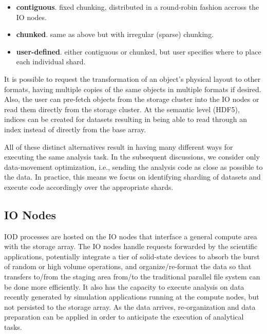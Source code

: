 \documentclass[conference]{IEEEtran}
\begin{document}
\begin{itemize}
\itemsep1pt\parskip0pt
\item
  \textbf{contiguous}. fixed chunking, distributed in a round-robin
  fashion accross the IO nodes.
\item
  \textbf{chunked}. same as above but with irregular (sparse) chunking.
\item
  \textbf{user-defined}. either contiguous or chunked, but user specifies
  where to place each individual shard.
\end{itemize}

It is possible to request the transformation of an object's physical
layout to other formats, having multiple copies of the same objects in
multiple formats if desired. Also, the user can pre-fetch objects from
the storage cluster into the IO nodes or read them directly from the
storage cluster. At the semantic level (HDF5), indices can be created
for datasets resulting in being able to read through an index instead of
directly from the base array.

All of these distinct alternatives result in having many different ways for
executing the same analysis task.  In the subsequent discussions, we consider
only data-movement optimization, i.e., sending the analysis code as close as
possible to the data. In practice, this means we focus on identifying sharding
of datasets and execute code accordingly over the appropriate shards.

\subsection{IO Nodes}
IOD processes are hosted on the IO nodes that interface a general compute area
with the storage array. The IO nodes handle requests forwarded by the
scientific applications, potentially integrate a tier of solid-state devices to
absorb the burst of random or high volume operations, and organize/re-format
the data so that transfers to/from the staging area from/to the traditional
parallel file system can be done more efficiently. It also has the capacity to
execute analysis on data recently generated by simulation applications running
at the compute nodes, but not persisted to the storage array. As the data
arrives, re-organization and data preparation can be applied in order to
anticipate the execution of analytical tasks.
\end{document}
